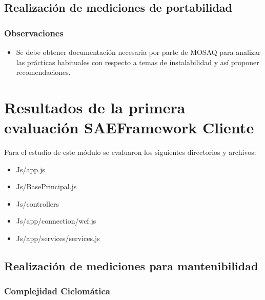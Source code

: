 \subsection{Realización de mediciones de portabilidad}

\subsubsection{Observaciones}
\begin{itemize}
\item Se debe obtener documentación necesaria por parte de MOSAQ para analizar 
las prácticas habituales con respecto a temas de instalabilidad y así proponer recomendaciones.
\end{itemize}

\section{Resultados de la primera evaluación SAEFramework Cliente}

Para el estudio de este módulo se evaluaron los siguientes directorios y archivos:
\begin{itemize}
\item Js/app.js
\item Js/BasePrincipal.js
\item Js/controllers
\item Js/app/connection/wcf.js
\item Js/app/services/services.js
\end{itemize}


\subsection{Realización de mediciones para mantenibilidad}
\subsubsection{Complejidad Ciclomática}

